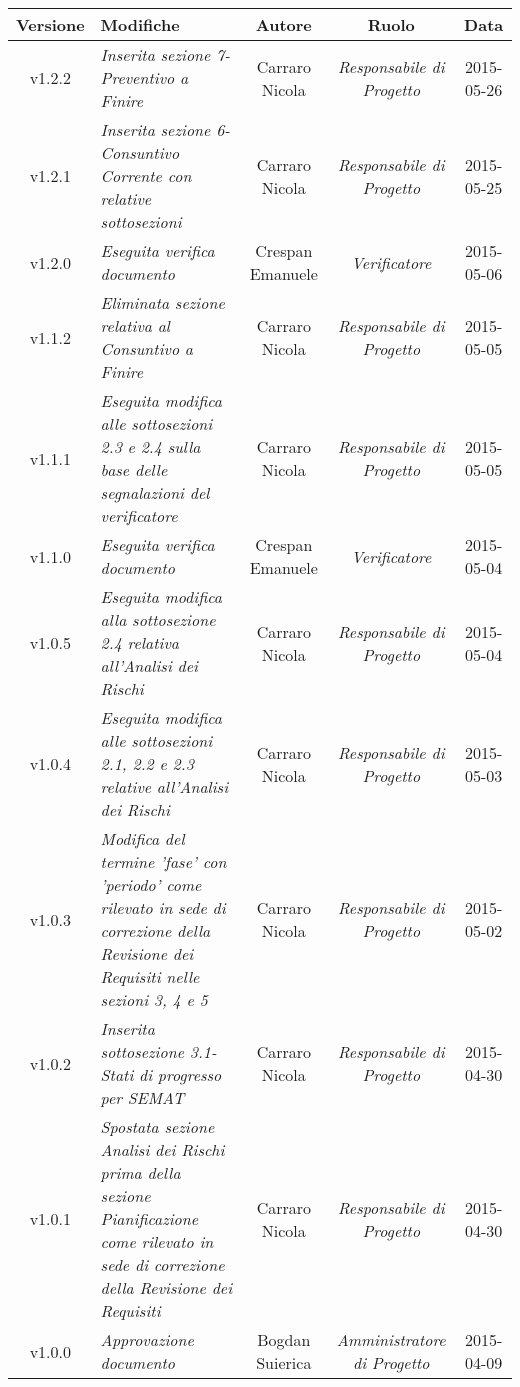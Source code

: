 \newpage

\begin{table}[h]
\centering
\begin{tabular}{|c|p{}|c|c|c|}
	\toprule
		\textbf{Versione} & \textbf{Modifiche} & \textbf{Autore} & \textbf{Ruolo} & \textbf{Data}\\
	\midrule
	\midrule
		v1.2.2 & \textit{Inserita sezione 7-Preventivo a Finire} & Carraro Nicola & \textit{Responsabile di Progetto} & 2015-05-26\\
	\midrule
		v1.2.1 & \textit{Inserita sezione 6-Consuntivo Corrente con relative sottosezioni} & Carraro Nicola & \textit{Responsabile di Progetto} & 2015-05-25\\
	\midrule
		v1.2.0 & \textit{Eseguita verifica documento} & Crespan Emanuele & \textit{Verificatore} & 2015-05-06\\
	\midrule
		v1.1.2 & \textit{Eliminata sezione relativa al Consuntivo a Finire} & Carraro Nicola & \textit{Responsabile di Progetto} & 2015-05-05\\
	\midrule
		v1.1.1 & \textit{Eseguita modifica alle sottosezioni 2.3 e 2.4 sulla base delle segnalazioni del verificatore} & Carraro Nicola & \textit{Responsabile di Progetto} & 2015-05-05\\
	\midrule
		v1.1.0 & \textit{Eseguita verifica documento} & Crespan Emanuele & \textit{Verificatore} & 2015-05-04\\
	\midrule
		v1.0.5 & \textit{Eseguita modifica alla sottosezione 2.4 relativa all'Analisi dei Rischi} & Carraro Nicola & \textit{Responsabile di Progetto} & 2015-05-04\\
	\midrule
		v1.0.4 & \textit{Eseguita modifica alle sottosezioni 2.1, 2.2 e 2.3 relative all'Analisi dei Rischi} & Carraro Nicola & \textit{Responsabile di Progetto} & 2015-05-03\\
	\midrule
		v1.0.3 & \textit{Modifica del termine 'fase' con 'periodo' come rilevato in sede di correzione della Revisione dei Requisiti nelle sezioni 3, 4 e 5} & Carraro Nicola & \textit{Responsabile di Progetto} & 2015-05-02\\
	\midrule
		v1.0.2 & \textit{Inserita sottosezione 3.1-Stati di progresso per SEMAT} & Carraro Nicola & \textit{Responsabile di Progetto} & 2015-04-30\\
	\midrule
		v1.0.1 & \textit{Spostata sezione Analisi dei Rischi prima della sezione Pianificazione come rilevato in sede di correzione della Revisione dei Requisiti} & Carraro Nicola & \textit{Responsabile di Progetto} & 2015-04-30\\
	\midrule
		v1.0.0 & \textit{Approvazione documento} & Bogdan Suierica & \textit{Amministratore di Progetto} & 2015-04-09\\
	\bottomrule
\end{tabular}
\end{table}

